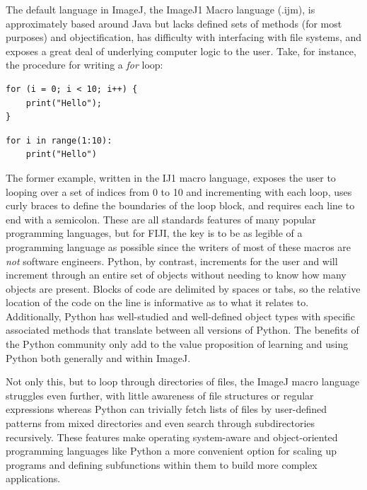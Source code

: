 The default language in ImageJ, the ImageJ1 Macro language (.ijm), is approximately based around Java but lacks defined sets of methods (for most purposes) and objectification, has difficulty with interfacing with file systems, and exposes a great deal of underlying computer logic to the user. Take, for instance, the procedure for writing a \textit{for} loop:

\begin{code}
\begin{verbatim}
for (i = 0; i < 10; i++) {
    print("Hello");
}
\end{verbatim}
\end{code}

\begin{code}
\begin{verbatim}
for i in range(1:10):
    print("Hello")
\end{verbatim}
\end{code}

The former example, written in the IJ1 macro language, exposes the user to looping over a set of indices from 0 to 10 and incrementing with each loop, uses curly braces to define the boundaries of the loop block, and requires each line to end with a semicolon. These are all standards features of many popular programming languages, but for FIJI, the key is to be as legible of a programming language as possible since the writers of most of these macros are \textit{not} software engineers. Python, by contrast, increments for the user and will increment through an entire set of objects without needing to know how many objects are present. Blocks of code are delimited by spaces or tabs, so the relative location of the code on the line is informative as to what it relates to. Additionally, Python has well\hyp{}studied and well\hyp{}defined object types with specific associated methods that translate between all versions of Python. The benefits of the Python community only add to the value proposition of learning and using Python both generally and within ImageJ.

Not only this, but to loop through directories of files, the ImageJ macro language struggles even further, with little awareness of file structures or regular expressions whereas Python can trivially fetch lists of files by user\hyp{}defined patterns from mixed directories and even search through subdirectories recursively. These features make operating system-aware and object-oriented programming languages like Python a more convenient option for scaling up programs and defining subfunctions within them to build more complex applications.
 
